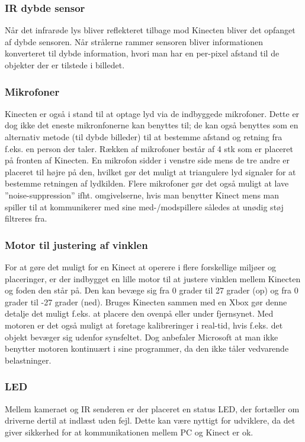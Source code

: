 \subsubsection{IR dybde sensor}
Når det infrarøde lys bliver reflekteret tilbage mod Kinecten bliver det opfanget af dybde sensoren. 
Når strålerne rammer sensoren bliver informationen konverteret til dybde information, hvori man har en per-pixel afstand til de objekter der er tilstede i billedet.

\subsubsection{Mikrofoner}
Kinecten er også i stand til at optage lyd via de indbyggede mikrofoner.
Dette er dog ikke det eneste mikronfonerne kan benyttes til; de kan også benyttes som en alternativ metode (til dybde billeder) til at bestemme afstand og retning fra f.eks. en person der taler.
Rækken af mikrofoner består af 4 stk som er placeret på fronten af Kinecten.
En mikrofon sidder i venstre side mens de tre andre er placeret til højre på den, hvilket gør det muligt at triangulere lyd signaler for at bestemme retningen af lydkilden.
Flere mikrofoner gør det også muligt at lave ”noise-suppression” ifht. omgivelserne, hvis man benytter Kinect mens man spiller til at kommunikerer med sine med-/modspillere således at unødig støj filtreres fra\cite[s.~15]{kinectProgrammingGuide}.

\subsubsection{Motor til justering af vinklen}
For at gøre det muligt for en Kinect at operere i flere forskellige miljøer og placeringer, er der indbygget en lille motor til at justere vinklen mellem Kinecten og foden den står på.
Den kan bevæge sig fra 0 grader til 27 grader (op) og fra 0 grader til -27 grader (ned).
Bruges Kinecten sammen med en Xbox gør denne detalje det muligt f.eks. at placere den ovenpå eller under fjernsynet.
Med motoren er det også muligt at foretage kalibreringer i real-tid, hvis f.eks. det objekt bevæger sig udenfor synsfeltet.
Dog anbefaler Microsoft at man ikke benytter motoren kontinuært i sine programmer, da den ikke tåler vedvarende belastninger\cite{kinectDocElevationAngle}.

\subsubsection{LED}
Mellem kameraet og IR senderen er der placeret en status LED, der fortæller om driverne dertil at indlæst uden fejl.
Dette kan være nyttigt for udviklere, da det giver sikkerhed for at kommunikationen mellem PC og Kinect er ok\cite[s.~15]{kinectProgrammingGuide}.

